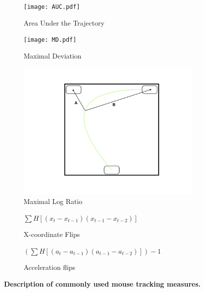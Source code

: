 \documentclass[11pt]{article}
\begin{document}
\begin{figure}[h]
\centering
\begin{subfigure}[b]{0.3\textwidth}
\texttt{[image: AUC.pdf]}
\caption{Area Under the Trajectory}
\end{subfigure}
%
\begin{subfigure}[b]{0.3\textwidth}
\texttt{[image: MD.pdf]}
\caption{Maximal Deviation}
\end{subfigure}
%
\begin{subfigure}[b]{0.3\textwidth}
\includegraphics[width=\textwidth]{MaxRatio.jpeg}
\caption{Maximal Log Ratio}
\end{subfigure}
\vspace{.5cm}

\begin{subfigure}[b]{0.45\textwidth}
\caption{X-coordinate Flips}
\centering
\(\sum H[(x_{t} - x_{t-1})(x_{t-1} - x_{t-2})] \)
\end{subfigure}
%
\begin{subfigure}[b]{0.45\textwidth}
\caption{Acceleration flips}
\centering
\((\sum H[( a_{t} - a_{t-1})( a_{t-1} - a_{t-2})])-1 \)

\end{subfigure}

\caption{\textbf{Description of commonly used mouse tracking measures.}}
\label{fig:traditional-measures}

\end{figure}
\end{document}

